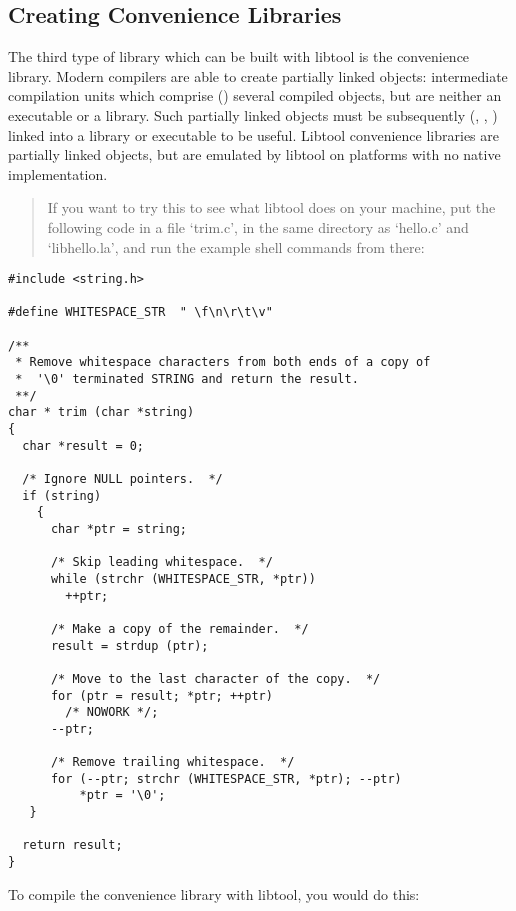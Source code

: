 \subsection{Creating Convenience Libraries}\label{US_Creating_Convenience_Libraries}

The third type of library which can be built with libtool is the convenience library. Modern compilers are able to create partially linked objects:
intermediate compilation units which comprise ({\MdQ{}}) several compiled objects,
but are neither an executable or a library. Such partially linked objects must 
be subsequently ({\MaQ{}}, {\McQ{}}, {\MbQ{}}) linked into a library or executable to be 
useful. Libtool convenience libraries are partially linked objects, but are 
emulated by libtool on platforms with no native implementation. 

\begin{quote}
If you want to try this to see what libtool does on your machine, put the 
following code in a file `trim.c', in the same directory as `hello.c' and 
`libhello.la', and run the example shell commands from there: 
\end{quote}

\begin{Verbatim}
#include <string.h>

#define WHITESPACE_STR  " \f\n\r\t\v"

/**
 * Remove whitespace characters from both ends of a copy of
 *  '\0' terminated STRING and return the result.
 **/
char * trim (char *string)
{
  char *result = 0;

  /* Ignore NULL pointers.  */
  if (string)
    {
      char *ptr = string;

      /* Skip leading whitespace.  */
      while (strchr (WHITESPACE_STR, *ptr))
        ++ptr;

      /* Make a copy of the remainder.  */
      result = strdup (ptr);

      /* Move to the last character of the copy.  */
      for (ptr = result; *ptr; ++ptr)
        /* NOWORK */;
      --ptr;

      /* Remove trailing whitespace.  */
      for (--ptr; strchr (WHITESPACE_STR, *ptr); --ptr)
          *ptr = '\0';
   }

  return result;
}

\end{Verbatim}

To compile the convenience library with libtool, you would do this: 

